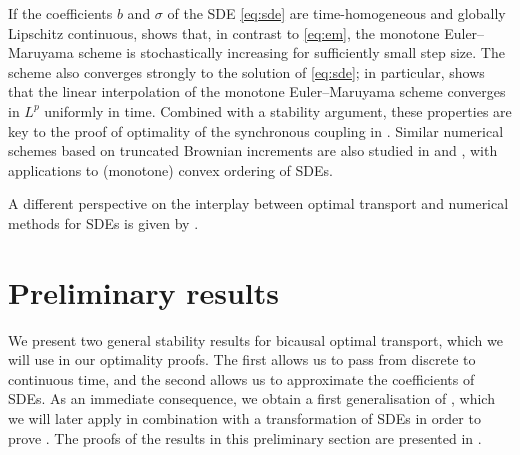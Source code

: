 \documentclass[onseside, final]{amsart}
\theoremstyle{definition}
\numberwithin{equation}{section}
\begin{document}
			If the coefficients $b$ and $\sigma$ of the SDE \eqref{eq:sde} are time-homogeneous and globally Lipschitz continuous, \cite[Lemma 3.14]{BaKaRo22} shows that, in contrast to \eqref{eq:em}, the monotone Euler--Maruyama scheme is stochastically increasing for sufficiently small step size. The scheme also converges strongly to the solution of \eqref{eq:sde}; in particular, \cite[Proposition 3.16]{BaKaRo22} shows that the linear interpolation of the monotone Euler--Maruyama scheme converges in $L^p$ uniformly in time. Combined with a stability argument, these properties are key to the proof of optimality of the synchronous coupling in \cite[Proposition 3.19]{BaKaRo22}. Similar numerical schemes based on truncated Brownian increments are also studied in \citet{LiPa22} and \citet{JoPa23}, with applications to (monotone) convex ordering of SDEs. 
			
			A different perspective on the interplay between optimal transport and numerical methods for SDEs is given by \citet{Da22}.
	
\section{Preliminary results}\label{sec:preliminaries}
	
	We present two general stability results for bicausal optimal transport, which we will use in our optimality proofs. The first allows us to pass from discrete to continuous time, and the second allows us to approximate the coefficients of SDEs. As an immediate consequence, we obtain a first generalisation of \cite[Theorem 1.3]{BaKaRo22}, which we will later apply in combination with a transformation of SDEs in order to prove . The proofs of the results in this preliminary section are presented in .
	
\end{document}
